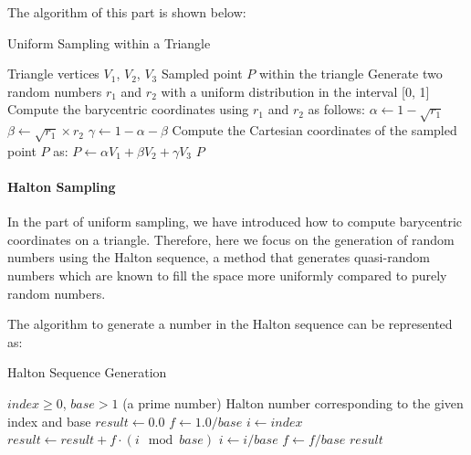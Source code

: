 \documentclass[11pt, a4paper,oneside,chapterprefix=false]{scrbook}
\begin{document}
\vspace{10pt}

The algorithm of this part is shown below: 

\begin{algorithm}
\caption{Uniform Sampling within a Triangle}\label{alg:uniform_sampling}
\begin{algorithmic}
\Require Triangle vertices \(V_1\), \(V_2\), \(V_3\)
\Ensure Sampled point \(P\) within the triangle
\State Generate two random numbers \(r_1\) and \(r_2\) with a uniform distribution in the interval [0, 1]
\State Compute the barycentric coordinates using \(r_1\) and \(r_2\) as follows:
\State \hspace{0.5cm} \( \alpha \gets 1 - \sqrt{r_1} \)
\State \hspace{0.5cm} \( \beta \gets \sqrt{r_1} \times r_2 \)
\State \hspace{0.5cm} \( \gamma \gets 1 - \alpha - \beta \)
\State Compute the Cartesian coordinates of the sampled point \(P\) as:
\State \hspace{0.5cm} \( P \gets \alpha V_1 + \beta V_2 + \gamma V_3 \)
\State \Return \(P\)
\end{algorithmic}
\end{algorithm}


\paragraph{Halton Sampling}

In the part of uniform sampling, we have introduced how to compute barycentric coordinates on a triangle. Therefore, here we focus on the generation of random numbers using the Halton sequence, a method that generates quasi-random numbers which are known to fill the space more uniformly compared to purely random numbers.

\vspace{10pt}

The algorithm to generate a number in the Halton sequence can be represented as:

\begin{algorithm}[H]
\caption{Halton Sequence Generation}\label{alg:halton}
\begin{algorithmic}
\Require $index \geq 0$, $base > 1$ (a prime number)
\Ensure Halton number corresponding to the given index and base
\State $result \gets 0.0$
\State $f \gets 1.0 / base$
\State $i \gets index$
    \State $result \gets result + f \cdot (i \mod base)$
    \State $i \gets i / base$  
    \State $f \gets f / base$
\EndWhile
\State \Return $result$
\end{algorithmic}
\end{algorithm}
\end{document}
